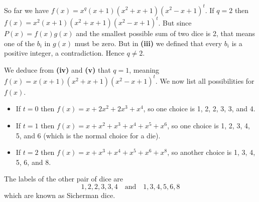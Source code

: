 \begin{questions}
\begin{partquestions}{\roman*}
        \item So far we have $f(x) = x^q(x+1)(x^2+x+1)(x^2-x+1)^t$. If $q = 2$ then $f(x) = x^2(x+1)(x^2+x+1)(x^2-x+1)^t$. But since $P(x) = f(x)g(x)$ and the smallest possible sum of two dice is 2, that means one of the $b_i$ in $g(x)$ must be zero. But in \textbf{(iii)} we defined that every $b_i$ is a positive integer, a contradiction. Hence $q \neq 2$.

        \item We deduce from \textbf{(iv)} and \textbf{(v)} that $q = 1$, meaning $f(x) = x(x+1)(x^2+x+1)(x^2-x+1)^t$. We now list all possibilities for $f(x)$.
        \begin{itemize}
            \item If $t = 0$ then $f(x) = x + 2x^2 + 2x^3 + x^4$, so one choice is 1, 2, 2, 3, 3, and 4.
            \item If $t = 1$ then $f(x) = x + x^2 + x^3 + x^4 + x^5 + x^6$, so one choice is 1, 2, 3, 4, 5, and 6 (which is the normal choice for a die).
            \item If $t = 2$ then $f(x) = x + x^3 + x^4 + x^5 + x^6 + x^8$, so another choice is 1, 3, 4, 5, 6, and 8.
        \end{itemize}

        \item The labels of the other pair of dice are
        \[
            1,2,2,3,3,4 \quad\text{and}\quad 1,3,4,5,6,8
        \]
        which are known as Sicherman dice.
    \end{partquestions}
\end{questions}
